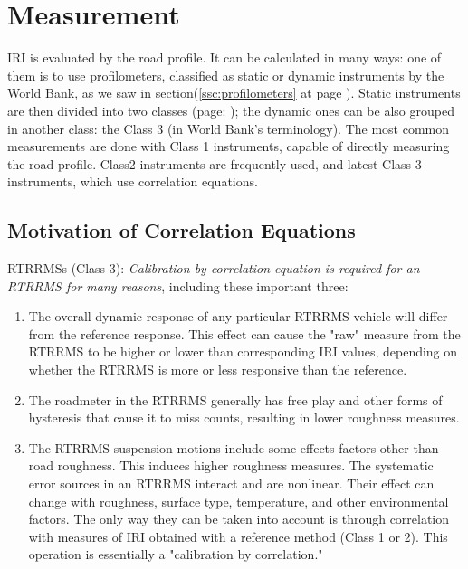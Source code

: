 \documentclass[tesi]{subfiles}
\begin{document}
\section{Measurement}\label{Measurement of IRI}
IRI is evaluated by the road profile. It can be calculated in many ways: one of them is to use profilometers, classified as static or dynamic instruments by the World Bank, as we saw in section(\ref{ssc:profilometers} at page \pageref{ssc:profilometers}). Static instruments are then divided into two classes (page: \pageref{ssc:Instrument_Contact}); the dynamic ones can be also grouped in another class: the Class 3 (in World Bank's terminology).
The most common measurements are done with Class 1 instruments, capable of directly measuring the road profile. Class2 instruments are frequently used, and latest Class 3 instruments, which use correlation equations.
\clearpage
\subsection{Motivation of Correlation Equations}\label{ssc:correlation}
RTRRMSs (Class 3):  \textit{Calibration by correlation equation is required for an RTRRMS for many reasons}, including these important three\cite{little_book}:
\begin{enumerate}
\item The overall dynamic response of any particular RTRRMS vehicle will differ from the reference response. This effect can cause the "raw" measure from the RTRRMS to be higher or lower than corresponding IRI values, depending on whether the RTRRMS is more or less responsive than the reference.

\item The roadmeter in the RTRRMS generally has free play and other forms of hysteresis that cause it to miss counts, resulting in lower roughness measures.

\item The RTRRMS suspension motions include some effects factors other than road roughness. This induces higher roughness measures. The systematic error sources in an RTRRMS interact and are nonlinear. Their effect can change with roughness, surface type, temperature, and other environmental factors. The only way they can be taken into account is through correlation with measures of IRI obtained with a reference method (Class 1 or 2). This operation is essentially a "calibration by correlation."

\end{enumerate}
\end{document}
